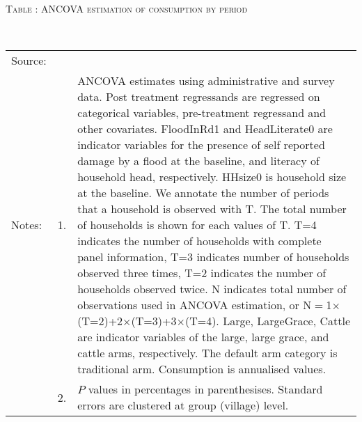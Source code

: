 \hspace{-1cm}\begin{minipage}[t]{14cm}
\hfil\textsc{\normalsize Table \thetable: ANCOVA estimation of consumption by period\label{tab ANCOVA consumption timevarying}}\\
\setlength{\tabcolsep}{1pt}
\setlength{\baselineskip}{8pt}
\renewcommand{\arraystretch}{.55}
\hfil{}\\
\renewcommand{\arraystretch}{.8}
\setlength{\tabcolsep}{1pt}
\begin{tabular}{>{\hfill\scriptsize}p{1cm}<{}>{\hfill\scriptsize}p{.25cm}<{}>{\scriptsize}p{12cm}<{\hfill}}
Source:& \multicolumn{2}{l}{\scriptsize Estimated with GUK administrative and survey data.}\\
Notes: & 1. & ANCOVA estimates using administrative and survey data. Post treatment regressands are regressed on categorical variables, pre-treatment regressand and other covariates. \textsf{FloodInRd1} and \textsf{HeadLiterate0} are indicator variables for the presence of self reported damage by a flood at the baseline, and literacy of household head, respectively. \textsf{HHsize0} is household size at the baseline. We annotate the number of periods that a household is observed with \textsf{T}. The total number of households is shown for each values of \textsf{T}. \textsf{T=4} indicates the number of households with complete panel information, \textsf{T=3} indicates number of households observed three times, \textsf{T=2} indicates the number of households observed twice. \textsf{N} indicates total number of observations used in ANCOVA estimation, or \textsf{N$=$1$\times$(T=2)+2$\times$(T=3)+3$\times$(T=4)}.  \textsf{Large}, \textsf{LargeGrace}, \textsf{Cattle} are indicator variables of the \textsf{large}, \textsf{large grace}, and \textsf{cattle} arms, respectively. The default arm category is \textsf{traditional} arm. Consumption is annualised values. \\
& 2. & $P$ values in percentages in parenthesises. Standard errors are clustered at group (village) level.
\end{tabular}
\end{minipage}


